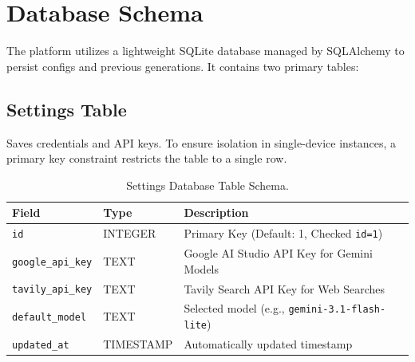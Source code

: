\documentclass[12pt,a4paper]{report}
\begin{document}
\section{Database Schema}
The platform utilizes a lightweight SQLite database managed by SQLAlchemy to persist configs and previous generations. It contains two primary tables:

\subsection{Settings Table}
Saves credentials and API keys. To ensure isolation in single-device instances, a primary key constraint restricts the table to a single row.
\begin{table}[h]
\centering
\begin{tabular}{lll}
\toprule
\textbf{Field} & \textbf{Type} & \textbf{Description} \\
\midrule
\texttt{id} & INTEGER & Primary Key (Default: 1, Checked \texttt{id=1}) \\
\texttt{google\_api\_key} & TEXT & Google AI Studio API Key for Gemini Models \\
\texttt{tavily\_api\_key} & TEXT & Tavily Search API Key for Web Searches \\
\texttt{default\_model} & TEXT & Selected model (e.g., \texttt{gemini-3.1-flash-lite}) \\
\texttt{updated\_at} & TIMESTAMP & Automatically updated timestamp \\
\bottomrule
\end{tabular}
\caption{Settings Database Table Schema.}
\label{tab:settings_schema}
\end{table}
\end{document}
